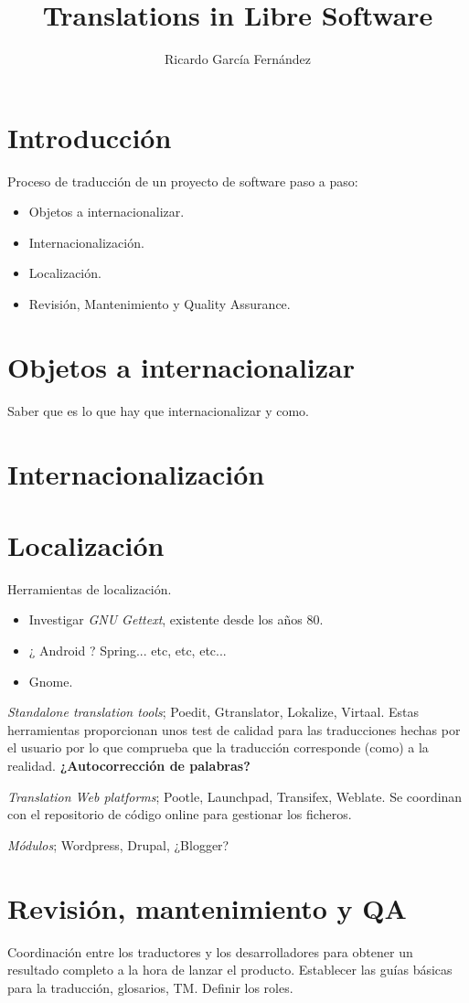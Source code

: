 \documentclass[11pt]{article}
\title{\textbf{Translations in Libre Software}}
\author{Ricardo Garc\'ia Fern\'andez}
\date{}
\begin{document}
\maketitle

\section{Introducci\'on}

Proceso de traducción de un proyecto de software paso a paso:
\begin{itemize}
    \item Objetos a internacionalizar.
    \item Internacionalización.
    \item Localización.
    \item Revisión, Mantenimiento y Quality Assurance.
\end{itemize}

\section{Objetos a internacionalizar}

Saber que es lo que hay que internacionalizar y como.

\section{Internacionalización}



\section{Localización}

Herramientas de localización.

\begin{itemize}
    \item Investigar \emph{GNU Gettext}, existente desde los años 80.
    \item ¿ Android ? Spring... etc, etc, etc...
    \item Gnome.
\end{itemize}

\emph{Standalone translation tools}; Poedit, Gtranslator, Lokalize, Virtaal.
    Estas herramientas proporcionan unos test de calidad para las traducciones hechas por el usuario por lo que comprueba que la traducción corresponde (como) a la realidad. \textbf{¿Autocorrección de palabras?}

\emph{Translation Web platforms}; Pootle, Launchpad, Transifex, Weblate.
Se coordinan con el repositorio de código online para gestionar los ficheros.

\emph{Módulos}; Wordpress, Drupal, ¿Blogger?

\section{Revisión, mantenimiento y QA}

Coordinación entre los traductores y los desarrolladores para obtener un resultado completo a la hora de lanzar el producto.
Establecer las guías básicas para la traducción, glosarios, TM.
Definir los roles.
\end{document}
